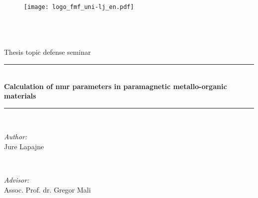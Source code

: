 \begin{titlepage}

\begin{figure}[t]
    \centering
    \texttt{[image: logo\_fmf\_uni-lj\_en.pdf]}
\end{figure}    

\newcommand{\HRule}{\rule{\linewidth}{0.5mm}} %

\center %
 

\textsc{\LARGE }\\[0cm] %
\textsc{\Large }\\[0cm] %
\textsc{\large }\\[0cm] Thesis topic defense seminar    %


\HRule \\[0.4cm]
{ \huge \bfseries Calculation of nmr parameters in paramagnetic metallo-organic materials}\\[0.4cm] %
\HRule \\[1.5cm]
 

\begin{minipage}{0.4\textwidth}
  \begin{flushleft} \large
   \raggedright
\emph{Author:}\\
Jure Lapajne \textsc{} %
\end{flushleft}
\end{minipage}
~
\begin{minipage}{0.45\textwidth}
  \begin{flushright} \large
    \raggedright
\emph{Advisor:} \\
Assoc. Prof. dr. Gregor Mali \textsc{} %
\end{flushright}
\end{minipage}\\[4cm]


\end{titlepage}
